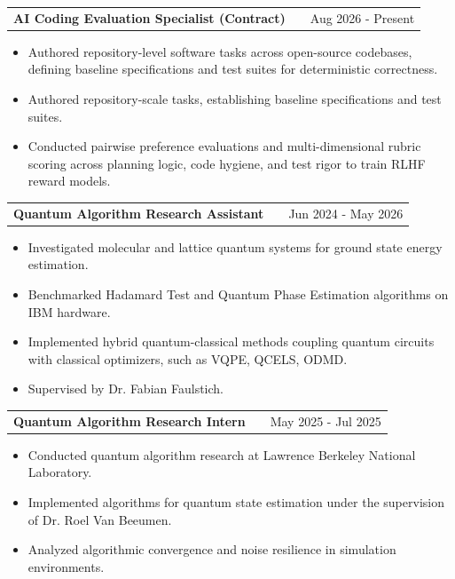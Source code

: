 \documentclass[a4paper,12pt]{article}
\makeatletter
\newenvironment{joblong}[2]
    {
    \begin{tabularx}{\linewidth}{@{}l X r@{}}
    \textbf{#1} & \hfill &  #2 \\[3.75pt]
    \end{tabularx}
    \begin{minipage}[t]{\linewidth}
    \begin{itemize}[nosep,after=\strut, leftmargin=1em, itemsep=3pt,label=--]
    }
    {
    \end{itemize}
    \end{minipage}    
    }
\makeatother
\begin{document}

\begin{joblong}{AI Coding Evaluation Specialist (Contract)}{Aug 2026 - Present}
    \item Authored repository-level software tasks across open-source codebases, defining baseline specifications and test suites for deterministic correctness.
    \item Authored repository-scale tasks, establishing baseline specifications and test suites.
    \item Conducted pairwise preference evaluations and multi-dimensional rubric scoring across planning logic, code hygiene, and test rigor to train RLHF reward models.
\end{joblong}

\begin{joblong}{Quantum Algorithm Research Assistant}{Jun 2024 - May 2026}
    \item Investigated molecular and lattice quantum systems for ground state energy estimation.
    \item Benchmarked Hadamard Test and Quantum Phase Estimation algorithms on IBM hardware.
    \item Implemented hybrid quantum-classical methods coupling quantum circuits with classical optimizers, such as VQPE, QCELS, ODMD.
    \item Supervised by Dr. Fabian Faulstich.
\end{joblong}

\begin{joblong}{Quantum Algorithm Research Intern}{May 2025 - Jul 2025}
    \item Conducted quantum algorithm research at Lawrence Berkeley National Laboratory.
    \item Implemented algorithms for quantum state estimation under the supervision of Dr. Roel Van Beeumen.
    \item Analyzed algorithmic convergence and noise resilience in simulation environments.
\end{joblong}
\end{document}
